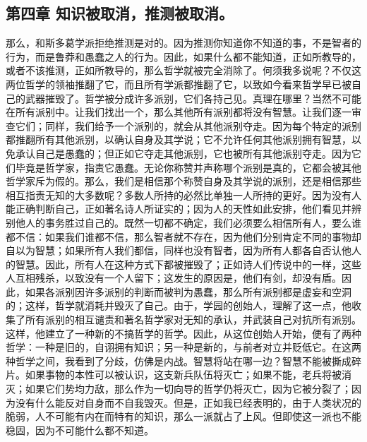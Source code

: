 
\subsection{第四章 知识被取消，推测被取消。}

那么，和斯多葛学派拒绝推测是对的。因为推测你知道你不知道的事，不是智者的行为，而是鲁莽和愚蠢之人的行为。因此，如果什么都不能知道，正如所教导的，或者不该推测，正如所教导的，那么哲学就被完全消除了。何须我多说呢？不仅这两位哲学的领袖推翻了它，而且所有学派都推翻了它，以致如今看来哲学早已被自己的武器摧毁了。哲学被分成许多派别，它们各持己见。真理在哪里？当然不可能在所有派别中。让我们找出一个，那么其他所有派别都将没有智慧。让我们逐一审查它们；同样，我们给予一个派别的，就会从其他派别夺走。因为每个特定的派别都推翻所有其他派别，以确认自身及其学说；它不允许任何其他派别拥有智慧，以免承认自己是愚蠢的；但正如它夺走其他派别，它也被所有其他派别夺走。因为它们毕竟是哲学家，指责它愚蠢。无论你称赞并声称哪个派别是真的，它都会被其他哲学家斥为假的。那么，我们是相信那个称赞自身及其学说的派别，还是相信那些相互指责无知的大多数呢？多数人所持的必然比单独一人所持的更好。因为没有人能正确判断自己，正如著名诗人所证实的；因为人的天性如此安排，他们看见并辨别他人的事务胜过自己的。既然一切都不确定，我们必须要么相信所有人，要么谁都不信：如果我们谁都不信，那么智者就不存在，因为他们分别肯定不同的事物却自以为智慧；如果所有人我们都信，同样也没有智者，因为所有人都各自否认他人的智慧。因此，所有人在这种方式下都被摧毁了；正如诗人们传说中的一样，这些人互相残杀，以致没有一个人留下；这发生的原因是，他们有剑，却没有盾。因此，如果各派别因许多派别的判断而被判为愚蠢，那么所有派别都是虚妄和空洞的；这样，哲学就消耗并毁灭了自己。由于，学园的创始人，理解了这一点，他收集了所有派别的相互谴责和著名哲学家对无知的承认，并武装自己对抗所有派别。这样，他建立了一种新的不搞哲学的哲学。因此，从这位创始人开始，便有了两种哲学：一种是旧的，自诩拥有知识；另一种是新的，与前者对立并贬低它。在这两种哲学之间，我看到了分歧，仿佛是内战。智慧将站在哪一边？智慧不能被撕成碎片。如果事物的本性可以被认识，这支新兵队伍将灭亡；如果不能，老兵将被消灭；如果它们势均力敌，那么作为一切向导的哲学仍将灭亡，因为它被分裂了；因为没有什么能反对自身而不自我毁灭。但是，正如我已经表明的，由于人类状况的脆弱，人不可能有内在而特有的知识，那么一派就占了上风。但即使这一派也不能稳固，因为不可能什么都不知道。\par

